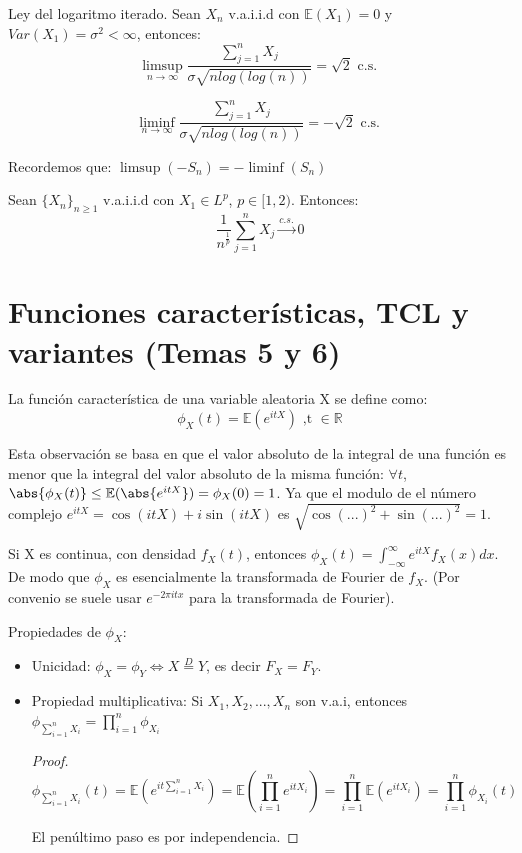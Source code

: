 \documentclass{apuntes}
\begin{document}
\begin{defn}
Ley del logaritmo iterado. Sean $X_n$ v.a.i.i.d con $\mathbb{E}(X_1)=0$ y $Var(X_1)=\sigma^2<\infty$, entonces:
\[
\limsup_{n \rightarrow \infty} \frac{\sum_{j=1}^{n} X_j}{\sigma \sqrt{nlog(log(n))}}=\sqrt{2} \text{ c.s. }
\]

\obs
\[
\liminf_{n \rightarrow \infty} \frac{\sum_{j=1}^{n} X_j}{\sigma \sqrt{nlog(log(n))}}=-\sqrt{2} \text{ c.s. }
\]

Recordemos que: $\limsup(-S_n) = -\liminf (S_n)$
\end{defn}

\begin{theorem}
Sean $\{X_n\}_{n\geq 1}$ v.a.i.i.d con $X_1 \in L^p$, $p\in [1,2)$. Entonces:
\[
\frac{1}{n^{\frac{1}{p}}} \sum_{j=1}^{n}X_j \stackrel{c.s.}{\rightarrow} 0
\]

\end{theorem}

\chapter{Funciones características, TCL y variantes (Temas 5 y 6)}
\begin{defn}
La función característica de una variable aleatoria X se define como:
\[
\phi_X(t)=\mathbb{E}(e^{itX}) \text{ ,t $\in \mathbb{R}$}
\]
\end{defn}

\obs Esta observación se basa en que el valor absoluto de la integral de una función es menor que la integral del valor absoluto de la misma función: $\forall t$, $\abs{\phi_X(t)} \leq \mathbb{E}(\abs{e^{itX}})=\phi_X(0)=1$. Ya que el modulo de el número complejo $e^{itX}=\cos(itX)+i\sin(itX)$ es $\sqrt{\cos(...)^2+\sin(...)^2}=1$.

Si X es continua, con densidad $f_X(t)$, entonces $\phi_X(t)=\int_{-\infty}^{\infty} e^{itX} f_X(x)dx$. De modo que $\phi_X$ es esencialmente la transformada de Fourier de $f_X$. (Por convenio se suele usar $e^{-2\pi itx}$ para la transformada de Fourier).

Propiedades de $\phi_X$:
\begin{itemize}
\item Unicidad: $\phi_X=\phi_Y \Leftrightarrow X \stackrel{D}{=} Y$, es decir $F_X=F_Y$.
\item Propiedad multiplicativa: Si $X_1, X_2,..., X_n$ son v.a.i, entonces $\phi_{\sum_{i=1}^{n}X_i}=\prod_{i=1}^{n}\phi_{X_i}$
\begin{proof}
\[
\phi_{\sum_{i=1}^{n}X_i}(t)=\mathbb{E}(e^{it\sum_{i=1}^{n}X_i})=\mathbb{E}(\prod_{i=1}^{n}e^{itX_i})=\prod_{i=1}^{n}\mathbb{E}(e^{itX_i})=\prod_{i=1}^{n}\phi_{X_i}(t)
\]

El penúltimo paso es por independencia.
\end{proof}
\end{itemize}
\end{document}
